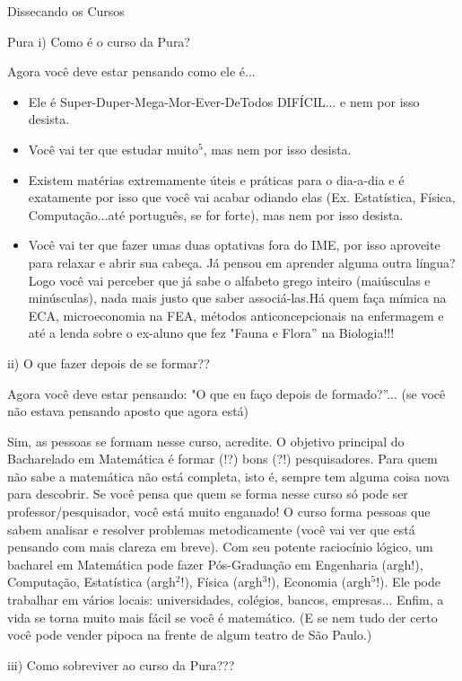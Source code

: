 \begin{secao}{Dissecando os Cursos}
\begin{subsecao}{Pura}
i) Como é o curso da Pura?

Agora você deve estar pensando como ele é...
\begin{itemize}

\item Ele é Super-Duper-Mega-Mor-Ever-DeTodos DIFÍCIL... e nem por isso desista.
\item  Você vai ter que estudar muito$^5$, mas nem por isso desista.
\item  Existem matérias extremamente úteis e práticas para o dia-a-dia e é exatamente por isso que você vai acabar odiando elas (Ex. Estatística, Física, Computação...até português, se for forte), mas nem por isso desista. 
\item  Você vai ter que fazer umas duas optativas fora do IME, por isso aproveite para relaxar e abrir sua cabeça. Já pensou em aprender alguma outra língua? Logo você vai perceber que já sabe o alfabeto grego inteiro (maiúsculas e minúsculas), nada mais justo que saber associá-las.Há quem faça mímica na ECA, microeconomia na FEA, métodos anticoncepcionais na enfermagem e até a lenda sobre o ex-aluno que fez "Fauna e Flora” na Biologia!!!

\end{itemize}
ii) O que fazer depois de se formar??

Agora você deve estar pensando: "O que eu faço depois de formado?”... (se você não estava pensando aposto que agora está) 

Sim, as pessoas se formam nesse curso, acredite. O objetivo principal do Bacharelado em Matemática é formar (!?) bons (?!) pesquisadores. Para quem não sabe a matemática não está completa, isto é, sempre tem alguma coisa nova para descobrir. Se você pensa que quem se forma nesse curso só pode ser professor/pesquisador, você está muito enganado! O curso forma pessoas que sabem analisar e resolver problemas metodicamente (você vai ver que está pensando com mais clareza em breve). Com seu potente raciocínio lógico, um bacharel em Matemática pode fazer Pós-Graduação em Engenharia (argh!), Computação, Estatística (argh$^2$!), Física (argh$^3$!), Economia (argh$^5$!). Ele pode trabalhar em vários locais: universidades, colégios, bancos, empresas... Enfim, a vida se torna muito mais fácil se você é matemático. (E se nem tudo der certo você pode vender pipoca na frente de algum teatro de São Paulo.)


iii) Como sobreviver ao curso da Pura???


\end{subsecao}
\end{secao}
